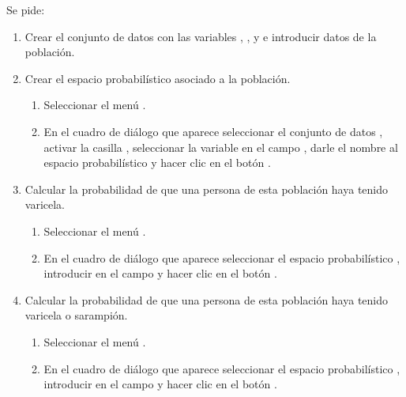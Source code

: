 \begin{enumerate}[leftmargin=*]
Se pide:
\begin{enumerate}
\item Crear el conjunto de datos  con las variables , ,
 y  e introducir datos de la población.

\item Crear el espacio probabilístico asociado a la población.
\begin{indicacion}{
\begin{enumerate}
\item Seleccionar el menú .
\item En el cuadro de diálogo que aparece seleccionar el conjunto de datos , activar la casilla
, seleccionar la variable  en el campo , darle el nombre
 al espacio probabilístico y hacer clic en el botón .
\end{enumerate}
}
\end{indicacion}  

\item Calcular la probabilidad de que una persona de esta población haya tenido varicela. 
\begin{indicacion}{
\begin{enumerate}
\item Seleccionar el menú .
\item En el cuadro de diálogo que aparece seleccionar el espacio probabilístico , introducir
 en el campo  y hacer clic en el botón .
\end{enumerate}
}
\end{indicacion} 

\item Calcular la probabilidad de que una persona de esta población haya tenido varicela o sarampión. 
\begin{indicacion}{
\begin{enumerate}
\item Seleccionar el menú .
\item En el cuadro de diálogo que aparece seleccionar el espacio probabilístico , introducir
 en el campo  y hacer clic en el botón .
\end{enumerate}
}
\end{indicacion} 


\end{enumerate}
\end{enumerate}
